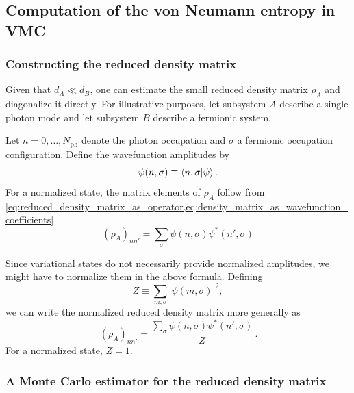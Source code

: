 \documentclass[../../main.tex]{subfiles}
\begin{document}
\subsection{Computation of the von Neumann entropy in VMC}
\label{subsec:von-neumann-entanglement-entropy-vmc}
\subsubsection{Constructing the reduced density matrix}

Given that $d_A\ll d_B$, one can estimate the small reduced density matrix $\rho_A$ and diagonalize it directly. For illustrative purposes, let subsystem $A$ describe a single photon mode and let subsystem $B$ describe a fermionic system.

Let $n=0,\dots,N_{\mathrm{ph}}$ denote the photon occupation and $\sigma$
a fermionic occupation configuration. Define the wavefunction amplitudes by
\begin{equation}
\psi(n,\sigma)\equiv\left\langle n,\sigma \middle| \psi \right\rangle.
\end{equation}
For a normalized state, the matrix elements of $\rho_A$ follow from \cref{eq:reduced_density_matrix_as_operator,eq:density_matrix_as_wavefunction_coefficients}
\begin{equation}
(\rho_A)_{nn'}
=\sum_\sigma\psi(n,\sigma)\psi^*(n',\sigma)
\end{equation}

Since variational states do not necessarily provide normalized amplitudes, we might have to normalize them in the above formula. Defining
\begin{equation}
Z\equiv\sum_{m,\sigma}|\psi(m,\sigma)|^2,
\end{equation}
we can write the normalized reduced density matrix more generally as
\begin{equation}
\boxed{\,
(\rho_A)_{nn'}
=\frac{\sum_\sigma\psi(n,\sigma)\psi^*(n',\sigma)}{Z}
\,}.
\end{equation}
For a normalized state, $Z=1$.

\subsubsection{A Monte Carlo estimator for the reduced density matrix}
\end{document}
